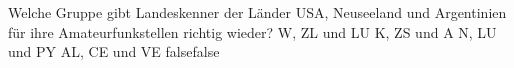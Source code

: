     {Welche Gruppe gibt Landeskenner der Länder USA, Neuseeland und Argentinien für ihre Amateurfunkstellen richtig wieder?}
    {W, ZL und LU}
    {K, ZS und A}
    {N, LU und PY}
    {AL, CE und VE}
    {false}{false}